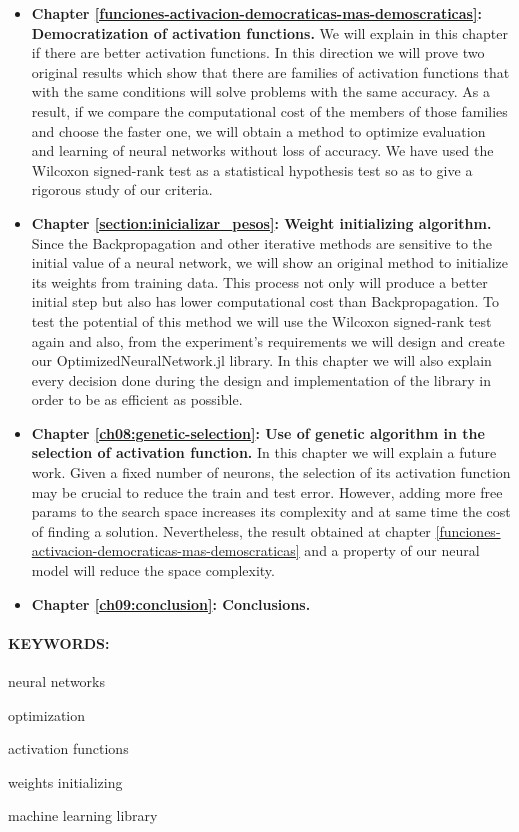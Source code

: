 \begin{itemize}
\item \textbf{Chapter \ref{funciones-activacion-democraticas-mas-demoscraticas}: Democratization of activation functions.} 
We will explain in this chapter if there are better activation functions. In this 
direction we will prove two original results which show that there are families of 
activation functions that with the same conditions will solve problems with the same 
accuracy. As a result, if we compare the computational cost of the members of those 
families and choose the faster one, we will obtain a method to optimize evaluation and 
learning of neural networks without loss of accuracy. We have used the Wilcoxon 
signed-rank test as a statistical hypothesis test so as to give a rigorous study of 
our criteria. 

\item \textbf{Chapter \ref{section:inicializar_pesos}: Weight initializing algorithm.} 
Since the Backpropagation and other iterative  methods are sensitive to the initial 
value of a neural network, we will show an original method to initialize its weights 
from training data. This process not only will produce a better initial step but also 
has lower computational cost than Backpropagation.  To test the potential of this 
method we will use the Wilcoxon signed-rank test again and also, from the experiment's 
requirements we will design and create our OptimizedNeuralNetwork.jl library. In this chapter we 
will also explain every decision done during the design and implementation of the 
library in order to be as efficient as possible.	

\item \textbf{Chapter \ref{ch08:genetic-selection}: Use of genetic algorithm in the selection of activation function.} 
In this chapter we will explain a future work. Given a fixed number of neurons, the 
selection of its activation function may be crucial to reduce the train and test 
error.  However, adding more free params to the search space increases its complexity 
and at same time the cost of finding a solution.  Nevertheless, the result obtained at 
chapter \ref{funciones-activacion-democraticas-mas-demoscraticas} and a property of our neural model will reduce the space complexity.

\item \textbf{Chapter \ref{ch09:conclusion}: Conclusions.}
\end{itemize} 

\paragraph{KEYWORDS:}
\begin{itemize*}[label=,itemsep=1em,itemjoin=\hspace{1em}]
  \item neural networks
  \item optimization
  \item activation functions
  \item weights initializing
  \item machine learning library
\end{itemize*}

\endinput
